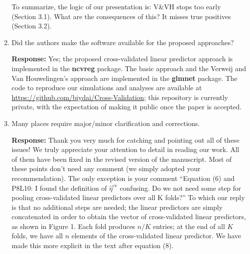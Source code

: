\documentclass{article}
\newcommand{\re}{\textbf{Response: }}
\begin{document}
\begin{enumerate}[align = left]
  To summarize, the logic of our presentation is: V\&VH stops too early (Section 3.1). What are the consequences of this? It misses true positives (Section 3.2).
  
\item Did the authors make the software available for the proposed approaches?

  \re Yes; the proposed cross-validated linear predictor approach is implemented in the \textbf{ncvreg} package. The basic approach and the Verweij and Van Houwelingen's approach are implemented in the \textbf{glmnet} package. The code to reproduce our simulations and analyses are available at \url{https://github.com/biydai/Cross-Validation}; this repository is currently private, with the expectation of making it public once the paper is accepted.

\item Many places require major/minor clarification and corrections.

  \re Thank you very much for catching and pointing out all of these issues! We truly appreciate your attention to detail in reading our work. All of them have been fixed in the revised version of the manuscript. Most of these points don't need any comment (we simply adopted your recommendation). The only exception is your comment ``Equation (6) and P8L10: I found the definition of $\hat{\eta}^{\text{cv}}$ confusing. Do we not need some step for pooling cross-validated linear predictors over all K folds?'' To which our reply is that no additional steps are needed; the linear predictors are simply concatenated in order to obtain the vector of cross-validated linear predictors, as shown in Figure 1. Each fold produces $n/K$ entries; at the end of all $K$ folds, we have all $n$ elements of the cross-validated linear predictor. We have made this more explicit in the text after equation (8).

\end{enumerate}
\end{document}
